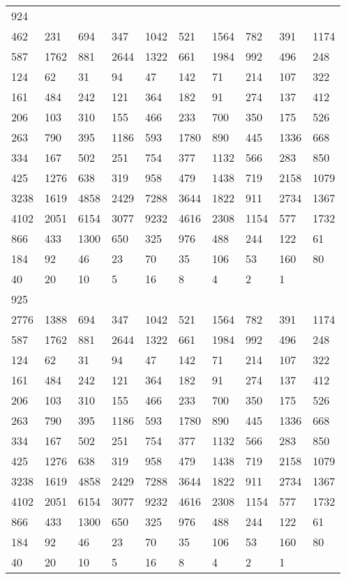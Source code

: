 \begin{longtable}{*{10}{l}}
924&&&&&&&&&\\
462& 231& 694& 347& 1042& 521& 1564& 782& 391& 1174\\
587& 1762& 881& 2644& 1322& 661& 1984& 992& 496& 248\\
124& 62& 31& 94& 47& 142& 71& 214& 107& 322\\
161& 484& 242& 121& 364& 182& 91& 274& 137& 412\\
206& 103& 310& 155& 466& 233& 700& 350& 175& 526\\
263& 790& 395& 1186& 593& 1780& 890& 445& 1336& 668\\
334& 167& 502& 251& 754& 377& 1132& 566& 283& 850\\
425& 1276& 638& 319& 958& 479& 1438& 719& 2158& 1079\\
3238& 1619& 4858& 2429& 7288& 3644& 1822& 911& 2734& 1367\\
4102& 2051& 6154& 3077& 9232& 4616& 2308& 1154& 577& 1732\\
866& 433& 1300& 650& 325& 976& 488& 244& 122& 61\\
184& 92& 46& 23& 70& 35& 106& 53& 160& 80\\
40& 20& 10& 5& 16& 8& 4& 2& 1& \\

925&&&&&&&&&\\
2776& 1388& 694& 347& 1042& 521& 1564& 782& 391& 1174\\
587& 1762& 881& 2644& 1322& 661& 1984& 992& 496& 248\\
124& 62& 31& 94& 47& 142& 71& 214& 107& 322\\
161& 484& 242& 121& 364& 182& 91& 274& 137& 412\\
206& 103& 310& 155& 466& 233& 700& 350& 175& 526\\
263& 790& 395& 1186& 593& 1780& 890& 445& 1336& 668\\
334& 167& 502& 251& 754& 377& 1132& 566& 283& 850\\
425& 1276& 638& 319& 958& 479& 1438& 719& 2158& 1079\\
3238& 1619& 4858& 2429& 7288& 3644& 1822& 911& 2734& 1367\\
4102& 2051& 6154& 3077& 9232& 4616& 2308& 1154& 577& 1732\\
866& 433& 1300& 650& 325& 976& 488& 244& 122& 61\\
184& 92& 46& 23& 70& 35& 106& 53& 160& 80\\
40& 20& 10& 5& 16& 8& 4& 2& 1& \\


\end{longtable}
